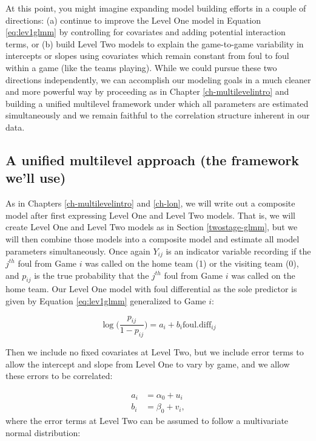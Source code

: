 \documentclass[
]{krantz}
\begin{document}
At this point, you might imagine expanding model building efforts in a couple of directions: (a) continue to improve the Level One model in Equation \eqref{eq:lev1glmm} by controlling for covariates and adding potential interaction terms, or (b) build Level Two models to explain the game-to-game variability in intercepts or slopes using covariates which remain constant from foul to foul within a game (like the teams playing). While we could pursue these two directions independently, we can accomplish our modeling goals in a much cleaner and more powerful way by proceeding as in Chapter \ref{ch-multilevelintro} and building a unified multilevel framework under which all parameters are estimated simultaneously and we remain faithful to the correlation structure inherent in our data.

\hypertarget{unified-glmm}{%
\subsection{A unified multilevel approach (the framework we'll use)}\label{unified-glmm}}

As in Chapters \ref{ch-multilevelintro} and \ref{ch-lon}, we will write out a composite model after first expressing Level One and Level Two models. That is, we will create Level One and Level Two models as in Section \ref{twostage-glmm}, but we will then combine those models into a composite model and estimate all model parameters simultaneously. Once again \(Y_{ij}\) is an indicator variable recording if the \(j^{th}\) foul from Game \(i\) was called on the home team (1) or the visiting team (0), and \(p_{ij}\) is the true probability that the \(j^{th}\) foul from Game \(i\) was called on the home team. Our Level One model with foul differential as the sole predictor is given by Equation \eqref{eq:lev1glmm} generalized to Game \(i\):

\[ \log\bigg(\frac{p_{ij}}{1-p_{ij}}\bigg)=a_i+b_i\mathrm{foul.diff}_{ij} \]

Then we include no fixed covariates at Level Two, but we include error terms to allow the intercept and slope from Level One to vary by game, and we allow these errors to be correlated:

\begin{align*}
a_i & = \alpha_{0}+u_i \\
b_i & = \beta_{0}+v_i,
\end{align*}
where the error terms at Level Two can be assumed to follow a multivariate normal distribution:
\end{document}
